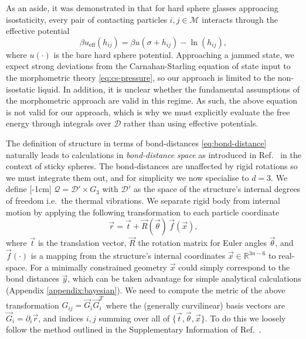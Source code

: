 \documentclass[11pt,twoside]{report}
\begin{document}
As an aside, it was demonstrated in \cite{BritoEEL2006} that for hard sphere glasses approacing isostaticity, every pair of contacting particles $i,j \in \mathcal{M}$ interacts through the effective potential
\begin{equation*}
  \beta u_\mathrm{eff}(h_{ij}) = \beta u(\sigma + h_{ij}) - \ln{(h_{ij})},
\end{equation*}
where $u(\cdot)$ is the bare hard sphere potential.
Approaching a jammed state, we expect strong deviations from the Carnahan-Starling equation of state input to the morphometric theory \eqref{eq:cs-pressure}, so our approach is limited to the non-isostatic liquid.
In addition, it is unclear whether the fundamental assumptions of the morphometric approach are valid in this regime.
As such, the above equation is not valid for our approach, which is why we must explicitly evaluate the free energy through integrals over $\mathcal{D}$ rather than using effective potentials.

The definition of structure in terms of bond-distances \eqref{eq:bond-distance} naturally leads to calculations in \emph{bond-distance space} as introduced in Ref.\ \cite{Holmes-CerfonPNAS2013} in the context of sticky spheres.
The bond-distances are unaffected by rigid rotations so we must integrate them out, and for simplicity we now specialise to $d=3$.
We define%
[-1cm]
$\mathcal{Q} = \mathcal{D}' \times G_3$ with $\mathcal{D}'$ as the space of the structure's internal degrees of freedom i.e.\ the thermal vibrations.
We separate rigid body from internal motion by applying the following transformation to each particle coordinate
\begin{equation*}
  \vec{r}
  =
  \vec{t} + \vec{R}(\vec{\theta}) \, \vec{f}(\vec{x}),
\end{equation*}
where $\vec{t}$ is the translation vector, $\vec{R}$ the rotation matrix for Euler angles $\vec{\theta}$, and $\vec{f}(\cdot)$ is a mapping from the structure's internal coordinates $\vec{x} \in \mathbb{R}^{3n-6}$ to real-space.
For a minimally constrained geometry $\vec{x}$ could simply correspond to the bond distances $\vec{y}$, which can be taken advantage for simple analytical calculations (Appendix \ref{appendix:bayesian}).
We need to compute the metric of the above transformation $G_{ij} = \vec{G}_i \vec{G}_i^T$ where the (generally curvilinear) basis vectors are $\vec{G}_i = \partial_i \vec{r}$, and indices $i,j$ summing over all of $\{\vec{t}, \vec{\theta}, \vec{x}\}$.
To do this we loosely follow the method outlined in the Supplementary Information of Ref.\ \cite{Holmes-CerfonPNAS2013}.
\end{document}
